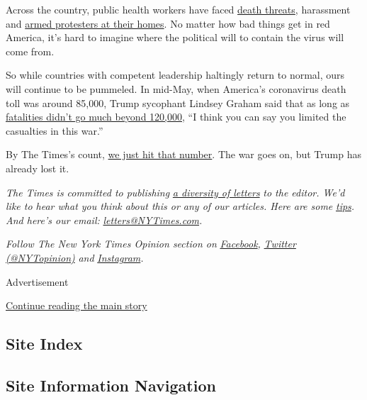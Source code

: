 Across the country, public health workers have faced
\href{https://www.sfgate.com/bayarea/article/CA-health-directors-quit-amid-death-threats-15343863.php}{death
threats}, harassment and
\href{https://www.washingtonpost.com/health/amid-threats-and-political-pushback-public-health-officials-leaving-posts/2020/06/22/6075f7a2-b0cf-11ea-856d-5054296735e5_story.html}{armed
protesters at their homes}. No matter how bad things get in red America,
it's hard to imagine where the political will to contain the virus will
come from.

So while countries with competent leadership haltingly return to normal,
ours will continue to be pummeled. In mid-May, when America's
coronavirus death toll was around 85,000, Trump sycophant Lindsey Graham
said that as long as
\href{https://www.politico.com/news/2020/05/14/white-house-coronavirus-success-259792}{fatalities
didn't go much beyond 120,000}, ``I think you can say you limited the
casualties in this war.''

By The Times's count,
\href{https://www.nytimes3xbfgragh.onion/interactive/2020/us/coronavirus-us-cases.html\#states}{we
just hit that number}. The war goes on, but Trump has already lost it.

\emph{The Times is committed to publishing}
\href{https://www.nytimes3xbfgragh.onion/2019/01/31/opinion/letters/letters-to-editor-new-york-times-women.html}{\emph{a
diversity of letters}} \emph{to the editor. We'd like to hear what you
think about this or any of our articles. Here are some}
\href{https://help.nytimes3xbfgragh.onion/hc/en-us/articles/115014925288-How-to-submit-a-letter-to-the-editor}{\emph{tips}}\emph{.
And here's our email:}
\href{mailto:letters@NYTimes.com}{\emph{letters@NYTimes.com}}\emph{.}

\emph{Follow The New York Times Opinion section on}
\href{https://www.facebookcorewwwi.onion/nytopinion}{\emph{Facebook}}\emph{,}
\href{http://twitter.com/NYTOpinion}{\emph{Twitter (@NYTopinion)}}
\emph{and}
\href{https://www.instagram.com/nytopinion/}{\emph{Instagram}}\emph{.}

Advertisement

\protect\hyperlink{after-bottom}{Continue reading the main story}

\hypertarget{site-index}{%
\subsection{Site Index}\label{site-index}}

\hypertarget{site-information-navigation}{%
\subsection{Site Information
Navigation}\label{site-information-navigation}}

